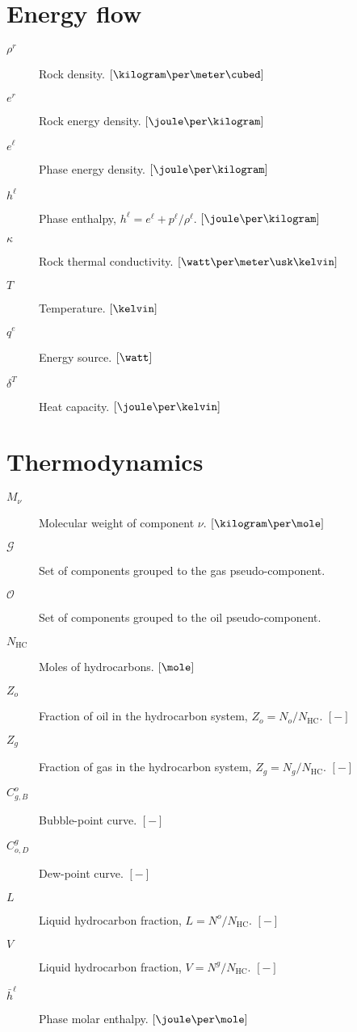 
\section{Energy flow}

\begin{description}
\item[$\rho^r$] Rock density. $\left[\kilogram\per\meter\cubed\right]$
\item[$e^r$] Rock energy density. $\left[\joule\per\kilogram\right]$
\item[$e^\ell$] Phase energy density. $\left[\joule\per\kilogram\right]$
\item[$h^\ell$] Phase enthalpy, $h^\ell=e^\ell+p^\ell/\rho^\ell$.
  $\left[\joule\per\kilogram\right]$
\item[$\kappa$] Rock thermal conductivity.
  $\left[\watt\per\meter\usk\kelvin\right]$
\item[$T$] Temperature. $\left[\kelvin\right]$
\item[$q^e$] Energy source. $\left[\watt\right]$
\item[$\delta^T$] Heat capacity. $\left[\joule\per\kelvin\right]$
\end{description}


\section{Thermodynamics}

\begin{description}
\item[$M_\nu$] Molecular weight of component $\nu$.
  $\left[\kilogram\per\mole\right]$
\item[$\mathcal{G}$] Set of components grouped to the gas
  pseudo-component.
\item[$\mathcal{O}$] Set of components grouped to the oil
  pseudo-component.
\item[$N_\text{HC}$] Moles of hydrocarbons. $\left[\mole\right]$
\item[$Z_o$] Fraction of oil in the hydrocarbon system,
  $Z_o=N_o/N_\text{HC}$. $\left[-\right]$
\item[$Z_g$] Fraction of gas in the hydrocarbon system,
  $Z_g=N_g/N_\text{HC}$. $\left[-\right]$
\item[$C_{g,B}^o$] Bubble-point curve. $\left[-\right]$
\item[$C_{o,D}^g$] Dew-point curve. $\left[-\right]$
\item[$L$] Liquid hydrocarbon fraction, $L=N^o/N_\text{HC}$. $\left[-\right]$
\item[$V$] Liquid hydrocarbon fraction, $V=N^g/N_\text{HC}$. $\left[-\right]$
\item[$\bar h^\ell$] Phase molar enthalpy.
  $\left[\joule\per\mole\right]$
\end{description}

